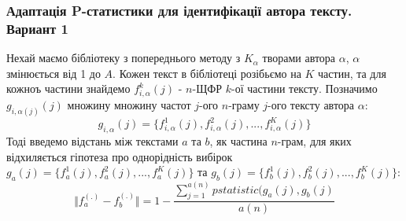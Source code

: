 \documentclass[12pt, a4paper]{extarticle}
\begin{document}
\subsubsection{Адаптація P-статистики для ідентифікації автора тексту. Вариант 1}
Нехай маємо бібліотеку з попереднього методу з $K_\alpha$ творами автора $\alpha$, $\alpha$ змінюється від 1 до $A$. Кожен текст в бібліотеці розібьємо на $K$ частин, та для кожноъ частини знайдемо $f_{i,\alpha}^k(j)$ - $n$-ЩФР $k$-ої частини тексту. Позначимо $g_{i,\alpha(j)}(j)$ множину множину частот $j$-ого $n$-граму $j$-ого тексту автора $\alpha$:
\begin{equation}\label{eq:12}
g_{i,\alpha}(j) = \{f_{i,\alpha}^1(j), f_{i,\alpha}^2(j), ..., f_{i,\alpha}^K(j)\}
\end{equation}
Тоді введемо відстань між текстами $a$ та $b$, як частина $n$-грам, для яких відхиляється гіпотеза про однорідність вибірок $g_a(j) = \{f_a^1(j), f_a^2(j), ..., f_a^K(j)\}$ та $g_b(j) = \{f_b^1(j), f_b^2(j), ..., f_b^K(j)\}$:
\begin{equation}\label{eq:14}
\Vert f_a^{(.)}-f_b^{(.)}\Vert = 1-\frac{\sum_{j=1}^{a(n)}pstatistic(g_a(j),g_b(j)}{a(n)}
\end{equation}

\end{document}
